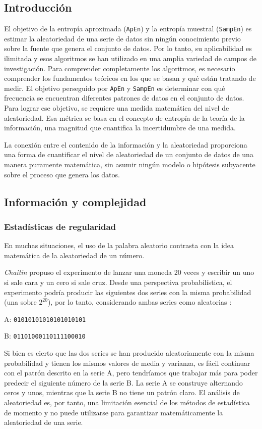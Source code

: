\documentclass[a4paper,12pt]{article}
\begin{document}
\subsection{Introducción}
El objetivo de la entropía aproximada (\texttt{ApEn}) y la entropía muestral (\texttt{SampEn}) es estimar la aleatoriedad de una serie de datos sin ningún conocimiento previo sobre la fuente que genera el conjunto de datos. Por lo tanto, su aplicabilidad es ilimitada y esos algoritmos se han utilizado en una amplia variedad de campos de investigación. Para comprender completamente los algoritmos, es necesario comprender los fundamentos teóricos en los que se basan y qué están tratando de medir. El objetivo perseguido por \texttt{ApEn} y \texttt{SampEn} es determinar con qué frecuencia se encuentran diferentes patrones de datos en el conjunto de datos. Para lograr ese objetivo, se requiere una medida matemática del nivel de aleatoriedad. Esa métrica se basa en el concepto de entropía de la teoría de la información, una magnitud que cuantifica la incertidumbre de una medida.

La conexión entre el contenido de la información y la aleatoriedad proporciona una forma de cuantificar el nivel de aleatoriedad de un conjunto de datos de una manera puramente matemática, sin asumir ningún modelo o hipótesis subyacente sobre el proceso que genera los datos. 

\subsection{Información y complejidad}
\subsubsection{Estadísticas de regularidad} 
En muchas situaciones, el uso de la palabra aleatorio contrasta con la idea matemática de la aleatoriedad de un número. 

\textit{Chaitin} \citep{chaitin} propuso el experimento de lanzar una moneda 20 veces y escribir un uno si sale cara y un cero si sale cruz. Desde una perspectiva probabilística, el experimento podría producir las siguientes dos series con la misma probabilidad (una sobre $2^{20}$), por lo tanto, considerando ambas series como aleatorias : 

A: \texttt{01010101010101010101}

B: \texttt{01101000110111100010}

Si bien es cierto que las dos series se han producido aleatoriamente con la misma probabilidad y tienen los mismos valores de media y varianza, es fácil continuar con el patrón descrito en la serie A, pero tendríamos que trabajar más para poder predecir el siguiente número de la serie B. La serie A se construye alternando ceros y unos, mientras que la serie B no tiene un patrón claro. El análisis de aleatoriedad es, por tanto, una limitación esencial de los métodos de estadística de momento y no puede utilizarse para garantizar matemáticamente la aleatoriedad de una serie.
\end{document}
